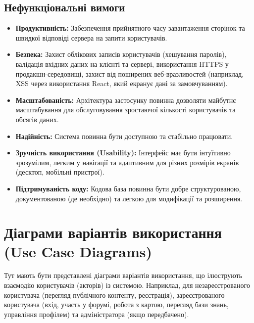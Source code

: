 \subsection{Нефункціональні вимоги}
\begin{itemize}
    \item \textbf{Продуктивність:} Забезпечення прийнятного часу завантаження сторінок та швидкої відповіді сервера на запити користувачів.
    \item \textbf{Безпека:} Захист облікових записів користувачів (хешування паролів), валідація вхідних даних на клієнті та сервері, використання HTTPS у продакшн-середовищі, захист від поширених веб-вразливостей (наприклад, XSS через використання React, який екранує дані за замовчуванням).
    \item \textbf{Масштабованість:} Архітектура застосунку повинна дозволяти майбутнє масштабування для обслуговування зростаючої кількості користувачів та обсягів даних.
    \item \textbf{Надійність:} Система повинна бути доступною та стабільно працювати.
    \item \textbf{Зручність використання (Usability):} Інтерфейс має бути інтуїтивно зрозумілим, легким у навігації та адаптивним для різних розмірів екранів (десктоп, мобільні пристрої).
    \item \textbf{Підтримуваність коду:} Кодова база повинна бути добре структурованою, документованою (де необхідно) та легкою для модифікації та розширення.
\end{itemize}

\section{Діаграми варіантів використання (Use Case Diagrams)}
\label{sec:use_cases}
Тут мають бути представлені діаграми варіантів використання, що ілюструють взаємодію користувачів (акторів) із системою. Наприклад, для незареєстрованого користувача (перегляд публічного контенту, реєстрація), зареєстрованого користувача (вхід, участь у форумі, робота з картою, перегляд бази знань, управління профілем) та адміністратора (якщо передбачено).

